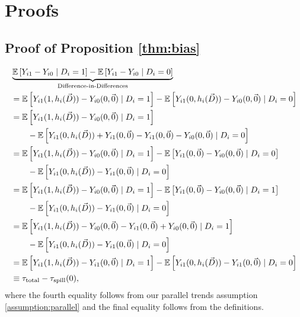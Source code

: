 \documentclass[11pt]{article}
\begin{document}
\section{Proofs}
\label{sec:proofs}

\subsection{Proof of Proposition \ref{thm:bias}}

\begin{align*}
    &\underbrace{\mathbb{E}\left[Y_{i1} - Y_{i0} \mid D_i = 1 \right] - \mathbb{E}\left[Y_{i1} - Y_{i0} \mid D_i = 0 \right]}_{\text{Difference-in-Differences}} \\
    &= \mathbb{E}\left[Y_{i1}(1, h_i(\vec{D})) - Y_{i0}(0, \vec{0})  \mid D_i = 1 \right] - \mathbb{E}\left[Y_{i1}(0, h_i(\vec{D})) - Y_{i0}(0, \vec{0}) \mid D_i = 0 \right] \\
    &= \mathbb{E}\left[Y_{i1}(1, h_i(\vec{D})) - Y_{i0}(0, \vec{0})  \mid D_i = 1 \right] \\
    &\quad\quad - \mathbb{E}\left[Y_{i1}(0, h_i(\vec{D})) + Y_{i1}(0, \vec{0}) - Y_{i1}(0, \vec{0}) - Y_{i0}(0, \vec{0}) \mid D_i = 0 \right] \\
    &= \mathbb{E}\left[Y_{i1}(1, h_i(\vec{D})) - Y_{i0}(0, \vec{0})  \mid D_i = 1 \right] - \mathbb{E}\left[Y_{i1}(0, \vec{0}) - Y_{i0}(0, \vec{0}) \mid D_i = 0\right] \\ 
    &\quad\quad - \mathbb{E}\left[Y_{i1}(0, h_i(\vec{D})) - Y_{i1}(0, \vec{0})\mid D_i = 0\right] \\ 
    &= \mathbb{E}\left[Y_{i1}(1, h_i(\vec{D})) - Y_{i0}(0, \vec{0})  \mid D_i = 1 \right] - \mathbb{E}\left[Y_{i1}(0, \vec{0}) - Y_{i0}(0, \vec{0}) \mid D_i = 1\right] \\
    &\quad\quad - \mathbb{E}\left[Y_{i1}(0, h_i(\vec{D})) - Y_{i1}(0, \vec{0})\mid D_i = 0\right] \\  
    &= \mathbb{E}\left[Y_{i1}(1, h_i(\vec{D})) - Y_{i0}(0, \vec{0}) - Y_{i1}(0, \vec{0}) + Y_{i0}(0, \vec{0})\mid D_i = 1 \right] \\
    &\quad\quad - \mathbb{E}\left[Y_{i1}(0, h_i(\vec{D})) - Y_{i1}(0, \vec{0})\mid D_i = 0\right]\\
    &= \mathbb{E}\left[Y_{i1}(1, h_i(\vec{D})) - Y_{i1}(0, \vec{0}) \mid D_i = 1 \right] - \mathbb{E}\left[Y_{i1}(0, h_i(\vec{D})) - Y_{i1}(0, \vec{0})\mid D_i = 0\right] \\
    &\equiv \tau_{\text{total}} - \tau_{\text{spill}}(0), 
\end{align*}
where the fourth equality follows from our parallel trends assumption \ref{assumption:parallel} and the final equality follows from the definitions.
\end{document}
